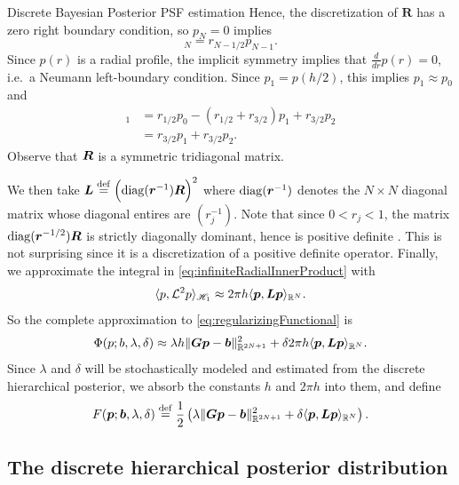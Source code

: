 \begin{chapter}{Discrete Bayesian Posterior PSF estimation}
Hence, the discretization of $\bm R$ has a zero right boundary condition, so $p_{N}= 0$ implies
\begin{equation}
  [\vect R\vect p]_N = r_{N-1/2}p_{N-1}.
\end{equation}
Since $p(r)$ is a radial profile, the implicit symmetry implies that $\frac d{dr}p(r) = 0$, i.e.~a Neumann left-boundary condition. 
Since $p_1 = p( h/2 )$, this implies $p_1 \approx p_{0}$ and
\begin{align}
  [\vect R\vect p]_1 &= r_{1/2}p_0 - (r_{1/2}+r_{3/2})p_1 + r_{3/2}p_{2} \nonumber\\
  &= r_{3/2}p_1 + r_{3/2}p_{2}.
\end{align}
Observe that $\mbox{\boldmath$R$}$ is a symmetric tridiagonal matrix.

We then take $\mbox{\boldmath$L$} \stackrel{\rm def}{=} \Big(\mathrm{diag}(\mbox{\boldmath$r$}^{-1}) \mbox{\boldmath$R$}\Big)^2$ where $\mathrm{diag}(\mbox{\boldmath$r$}^{-1})$ denotes the $N\times N$ diagonal matrix whose diagonal entires are $(r_j^{-1})$.
Note that since $0<r_j<1$, the matrix $\mathrm{diag}(\mbox{\boldmath$r$}^{-1/2}) \mbox{\boldmath$R$}$ is strictly diagonally dominant, hence is positive definite \citep[Theorem 3.4.3]{golub2012matrix}.
This is not surprising since it is a discretization of a positive definite operator.
Finally, we approximate the integral in \eqref{eq:infiniteRadialInnerProduct} with 
\begin{equation}\label{eq:psfDiscInvProblem}
  \langle p, \mathcal L^2 p\rangle_{\mathscr H_1} \approx 2\pi h \langle \mbox{\boldmath$p$}, \mbox{\boldmath$L$} \mbox{\boldmath$p$}\rangle_{\mathbb R^N}.
\end{equation}
So the complete approximation to \eqref{eq:regularizingFunctional} is
\begin{equation} \label{eq:discreteRegularizingFunctional}
  \Phi(p; b,\lambda,\delta) \approx \lambda h \|\mbox{\boldmath$G$}\mbox{\boldmath$p$} - \mbox{\boldmath$b$}\|_{\mathbb R^{2N+1}}^2 + \delta 2\pi h\langle \mbox{\boldmath$p$}, \mbox{\boldmath$L$} \mbox{\boldmath$p$}\rangle_{\mathbb R^N}.
\end{equation}
Since $\lambda$ and $\delta$ will be stochastically modeled and estimated from the discrete hierarchical posterior, we absorb the constants $h$ and $2\pi h$ into them, and define
\begin{equation} \label{discreteRegularizingFunctional}
  F(\mbox{\boldmath$p$}; \mbox{\boldmath$b$},\lambda,\delta) \stackrel{\rm def}{=} \frac 12\left(\lambda \|\mbox{\boldmath$G$}\mbox{\boldmath$p$} - \mbox{\boldmath$b$}\|_{\mathbb R^{2N+1}}^2 + \delta \langle \mbox{\boldmath$p$}, \mbox{\boldmath$L$} \mbox{\boldmath$p$}\rangle_{\mathbb R^N}\right).
\end{equation}
\subsection{The discrete hierarchical posterior distribution} \label{subsec:discretePosteriorDerivation}


\end{chapter}
